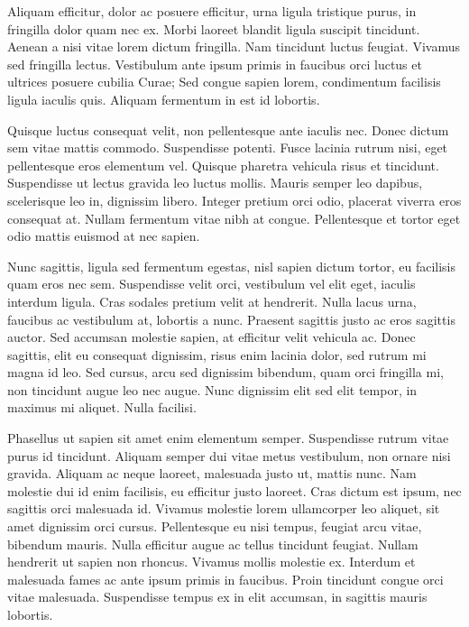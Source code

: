 \documentclass[pdftex, brazil, 12pt, twoside]{article}
\begin{document}
Aliquam efficitur, dolor ac posuere efficitur, urna ligula tristique purus, in fringilla dolor quam nec ex. Morbi laoreet blandit ligula suscipit tincidunt. Aenean a nisi vitae lorem dictum fringilla. Nam tincidunt luctus feugiat. Vivamus sed fringilla lectus. Vestibulum ante ipsum primis in faucibus orci luctus et ultrices posuere cubilia Curae; Sed congue sapien lorem, condimentum facilisis ligula iaculis quis. Aliquam fermentum in est id lobortis.

Quisque luctus consequat velit, non pellentesque ante iaculis nec. Donec dictum sem vitae mattis commodo. Suspendisse potenti. Fusce lacinia rutrum nisi, eget pellentesque eros elementum vel. Quisque pharetra vehicula risus et tincidunt. Suspendisse ut lectus gravida leo luctus mollis. Mauris semper leo dapibus, scelerisque leo in, dignissim libero. Integer pretium orci odio, placerat viverra eros consequat at. Nullam fermentum vitae nibh at congue. Pellentesque et tortor eget odio mattis euismod at nec sapien.

Nunc sagittis, ligula sed fermentum egestas, nisl sapien dictum tortor, eu facilisis quam eros nec sem. Suspendisse velit orci, vestibulum vel elit eget, iaculis interdum ligula. Cras sodales pretium velit at hendrerit. Nulla lacus urna, faucibus ac vestibulum at, lobortis a nunc. Praesent sagittis justo ac eros sagittis auctor. Sed accumsan molestie sapien, at efficitur velit vehicula ac. Donec sagittis, elit eu consequat dignissim, risus enim lacinia dolor, sed rutrum mi magna id leo. Sed cursus, arcu sed dignissim bibendum, quam orci fringilla mi, non tincidunt augue leo nec augue. Nunc dignissim elit sed elit tempor, in maximus mi aliquet. Nulla facilisi.

Phasellus ut sapien sit amet enim elementum semper. Suspendisse rutrum vitae purus id tincidunt. Aliquam semper dui vitae metus vestibulum, non ornare nisi gravida. Aliquam ac neque laoreet, malesuada justo ut, mattis nunc. Nam molestie dui id enim facilisis, eu efficitur justo laoreet. Cras dictum est ipsum, nec sagittis orci malesuada id. Vivamus molestie lorem ullamcorper leo aliquet, sit amet dignissim orci cursus. Pellentesque eu nisi tempus, feugiat arcu vitae, bibendum mauris. Nulla efficitur augue ac tellus tincidunt feugiat. Nullam hendrerit ut sapien non rhoncus. Vivamus mollis molestie ex. Interdum et malesuada fames ac ante ipsum primis in faucibus. Proin tincidunt congue orci vitae malesuada. Suspendisse tempus ex in elit accumsan, in sagittis mauris lobortis. 





\end{document}
